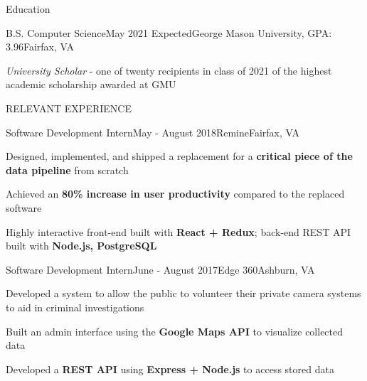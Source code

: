 \documentclass{resume} %
\begin{document}

\begin{rSection}{Education}
\begin{rSubsection}{B.S. Computer Science}{May 2021 Expected}{George Mason University, GPA: 3.96}{Fairfax, VA}

  \item \emph{University Scholar} - one of twenty recipients in class of 2021 of the highest academic scholarship awarded at GMU

\end{rSubsection}
\end{rSection}


\begin{rSection}{RELEVANT EXPERIENCE}

\begin{rSubsection}{Software Development Intern}{May - August 2018}{Remine}{Fairfax, VA} 

  \item Designed, implemented, and shipped a replacement for a \textbf{critical piece of the data pipeline} from scratch
  \item Achieved an \textbf{80\% increase in user productivity} compared to the replaced software
  \item Highly interactive front-end built with \textbf{React + Redux}; back-end REST API built with \textbf{Node.js, PostgreSQL}
  
\end{rSubsection}

\begin{rSubsection}{Software Development Intern}{June - August 2017}{Edge 360}{Ashburn, VA} 

  \item Developed a system to allow the public to volunteer their private camera systems to aid in criminal investigations
  \item Built an admin interface using the \textbf{Google Maps API} to visualize collected data
  \item Developed a \textbf{REST API} using \textbf{Express + Node.js} to access stored data
  
\end{rSubsection} 

\end{rSection}
\end{document}
